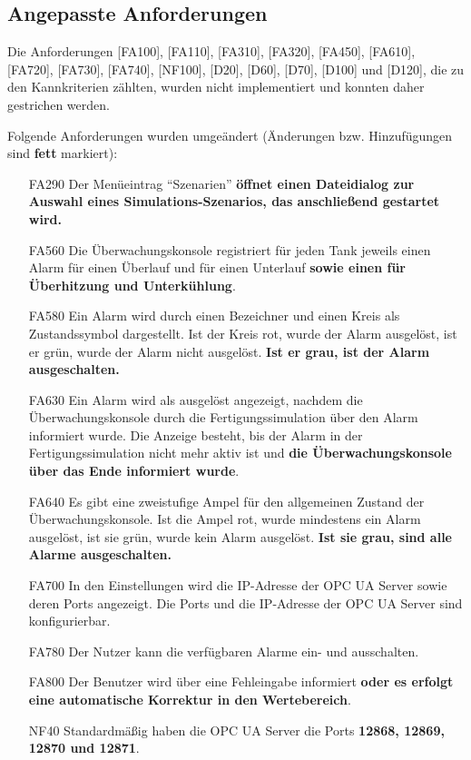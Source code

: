 \documentclass[parskip=full]{scrartcl}
\begin{document}
\subsection{Angepasste Anforderungen}
Die Anforderungen [FA100], [FA110], [FA310], [FA320], [FA450], [FA610], [FA720], [FA730], [FA740], [NF100], [D20], [D60], [D70], [D100] und [D120], die zu den Kannkriterien zählten, wurden nicht implementiert und konnten daher gestrichen werden.

Folgende Anforderungen wurden umgeändert (Änderungen bzw. Hinzufügungen sind \textbf{fett} markiert):
\begin{enumerate}
	\item[FA290] Der Menüeintrag "`Szenarien"' \textbf{öffnet einen Dateidialog zur Auswahl eines Simulations-Szenarios, das anschließend gestartet wird.}
	\item[FA560] Die Überwachungskonsole registriert für jeden Tank jeweils einen Alarm für einen Überlauf und für einen Unterlauf \textbf{sowie einen für Überhitzung und Unterkühlung}.
	\item[FA580] Ein Alarm wird durch einen Bezeichner und einen Kreis als Zustandssymbol dargestellt. Ist der Kreis rot, wurde der Alarm ausgelöst, ist er grün, wurde der Alarm nicht ausgelöst. \textbf{Ist er grau, ist der Alarm ausgeschalten.}
	\item[FA630] Ein Alarm wird als ausgelöst angezeigt, nachdem die Überwachungskonsole durch die Fertigungssimulation über den Alarm informiert wurde. Die Anzeige besteht, bis der Alarm in der Fertigungssimulation nicht mehr aktiv ist und \textbf{die Überwachungskonsole über das Ende informiert wurde}.
	\item[FA640] Es gibt eine zweistufige Ampel für den allgemeinen Zustand der Überwachungskonsole. Ist die Ampel rot, wurde mindestens ein Alarm ausgelöst, ist sie grün, wurde kein Alarm ausgelöst. \textbf{Ist sie grau, sind alle Alarme ausgeschalten.}
	\item[FA700] In den Einstellungen wird die IP-Adresse der OPC UA Server sowie deren Ports angezeigt. Die Ports und die IP-Adresse der OPC UA Server sind konfigurierbar.
	\item[FA780] Der Nutzer kann die verfügbaren Alarme ein- und ausschalten.
	\item[FA800] Der Benutzer wird über eine Fehleingabe informiert \textbf{oder es erfolgt eine automatische Korrektur in den Wertebereich}.
	\item[NF40] Standardmäßig haben die OPC UA Server die Ports \textbf{12868, 12869, 12870 und 12871}.

\end{enumerate}
\end{document}
